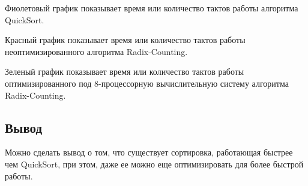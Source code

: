 \newpage

Фиолетовый график показывает время или количество тактов работы алгоритма QuickSort. 

Красный график показывает время или количество тактов работы неоптимизированного алгоритма Radix-Counting. 

Зеленый график показывает время или количество тактов работы оптимизированного под 8-процессорную вычислительную систему алгоритма Radix-Counting.

\subsection*{Вывод}
Можно сделать вывод о том, что существует сортировка, работающая быстрее чем QuickSort, при этом, даже ее можно еще оптимизировать для более быстрой работы.

